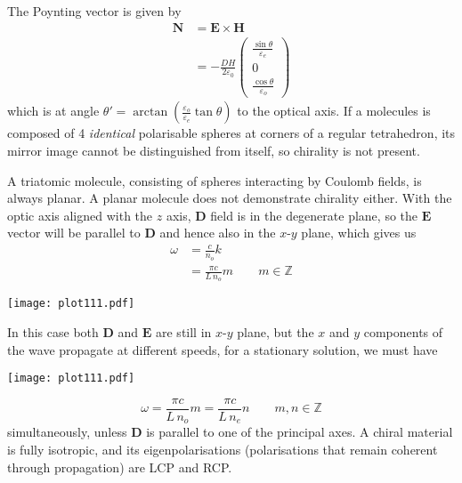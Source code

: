 \documentclass[12pt]{extarticle}
\renewcommand{\bf}{\mathbf}
\begin{document}
\begin{outline}[enumerate]
        \2 The Poynting vector is given by \begin{align*}
            \bf N &= \bf E \times \bf H\\
            &= -\frac{DH}{2\varepsilon_0}\begin{pmatrix} \frac{\sin\theta}{\varepsilon_e}\\0\\ \frac{\cos\theta }{\varepsilon_o}  \end{pmatrix} 
        \end{align*}
        which is at angle \(\theta ' = \arctan(\frac{\varepsilon_o}{\varepsilon_e}  \tan\theta )\) to the optical axis.
        \1 If a molecules is composed of 4 \textit{identical} polarisable spheres at corners of a regular tetrahedron, its mirror image cannot be distinguished from itself, so chirality is not present.

        A triatomic molecule, consisting of spheres interacting by Coulomb fields, is always planar. A planar molecule does not demonstrate chirality either.
        \1 \2\3With the optic axis aligned with the \(z\) axis, \(\bf D\) field is in the degenerate plane, so the \(\bf E\) vector will be parallel to \(\bf D\) and hence also in the \(x\)-\(y\) plane, which gives us 
        \begin{align*}
            \omega &=  \frac{c}{n_o} k \\
            &=  \frac{\pi c}{L\, n_o} m\qquad m\in \mathbb{Z}
        \end{align*}
        \begin{center}
            \texttt{[image: plot111.pdf]}
        \end{center}
        \3 In this case both \(\bf D\) and \(\bf E\) are still in \(x\text{-}y\) plane, but the \(x\) and \(y\) components of the wave propagate at different speeds, for a stationary solution, we must have 
        \begin{center}
            \texttt{[image: plot111.pdf]}
        \end{center}
        \[
            \omega = \frac{\pi c}{L\, n_o}m =\frac{\pi c}{L\, n_e}n \qquad m,n \in \mathbb{Z}
        \]
        simultaneously, unless \(\bf D\) is parallel to one of the principal axes. 
        \2 A chiral material is fully isotropic, and its eigenpolarisations (polarisations that remain coherent through propagation) are LCP and RCP.


\end{outline}
\end{document}
